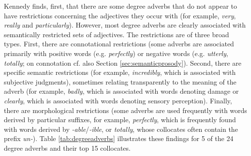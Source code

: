 Kennedy finds, first, that there are some degree adverbs that do not appear to have restrictions concerning the adjectives they occur with (for example, \textit{very}, \textit{really} and \textit{particularly}). However, most degree adverbs are clearly associated with semantically restricted sets of adjectives. The restrictions are of three broad types. First, there are connotational restrictions (some adverbs are associated primarily with positive words (e.g. \textit{perfectly}) or negative words (e.g. \textit{utterly}, \textit{totally}; on connotation cf. also Section \ref{sec:semanticprosody}). Second, there are specific semantic restrictions (for example, \textit{incredibly}, which is associated with subjective judgments), sometimes relating transparently to the meaning of the adverb (for example, \textit{badly}, which is associated with words denoting damage or \textit{clearly}, which is associated with words denoting sensory perception). Finally, there are morphological restrictions (some adverbs are used frequently with words derived by particular suffixes, for example, \textit{perfectly}, which is frequently found with words derived by \textit{-able}/\textit{-ible}, or \textit{totally}, whose collocates often contain the prefix \textit{un-}). Table \ref{tab:degreeadverbs} illustrates these findings for 5 of the 24 degree adverbs and their top 15 collocates. 


